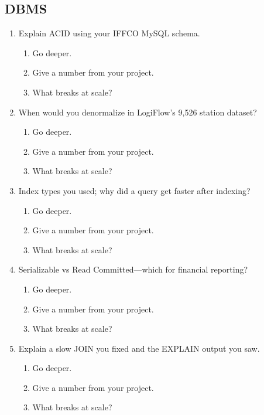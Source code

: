 \documentclass[9pt,a4paper]{article}
\begin{document}
\subsection{DBMS}
\begin{enumerate}[label=\textbf{Q\arabic*:}, leftmargin=*]
  \item Explain ACID using your IFFCO MySQL schema.
  \begin{enumerate}[label=\textit{FU\arabic*:}, leftmargin=2em]
    \item Go deeper.
    \item Give a number from your project.
    \item What breaks at scale?
  \end{enumerate}
  \item When would you denormalize in LogiFlow's 9,526 station dataset?
  \begin{enumerate}[label=\textit{FU\arabic*:}, leftmargin=2em]
    \item Go deeper.
    \item Give a number from your project.
    \item What breaks at scale?
  \end{enumerate}
  \item Index types you used; why did a query get faster after indexing?
  \begin{enumerate}[label=\textit{FU\arabic*:}, leftmargin=2em]
    \item Go deeper.
    \item Give a number from your project.
    \item What breaks at scale?
  \end{enumerate}
  \item Serializable vs Read Committed---which for financial reporting?
  \begin{enumerate}[label=\textit{FU\arabic*:}, leftmargin=2em]
    \item Go deeper.
    \item Give a number from your project.
    \item What breaks at scale?
  \end{enumerate}
  \item Explain a slow JOIN you fixed and the EXPLAIN output you saw.
  \begin{enumerate}[label=\textit{FU\arabic*:}, leftmargin=2em]
    \item Go deeper.
    \item Give a number from your project.
    \item What breaks at scale?
  \end{enumerate}
\end{enumerate}
\end{document}
